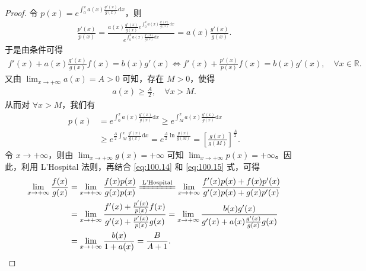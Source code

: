 \documentclass[../../main.tex]{subfiles}%
\begin{document}
\begin{proof}

令 \(p(x) = e^{\int_0^x a(x) \frac{g'(x)}{g(x)} \mathrm{d}x}\)，则
\begin{align}
\frac{p'(x)}{p(x)} = \frac{a(x) \frac{g'(x)}{g(x)} e^{\int_0^x a(x) \frac{g'(x)}{g(x)} \mathrm{d}x}}{e^{\int_0^x a(x) \frac{g'(x)}{g(x)} \mathrm{d}x}} = a(x) \frac{g'(x)}{g(x)}. \label{eq:100.14}
\end{align}
于是由条件可得
\begin{align}
f'(x) + a(x) \frac{g'(x)}{g(x)} f(x) = b(x) g'(x) \Longleftrightarrow f'(x) + \frac{p'(x)}{p(x)} f(x) = b(x) g'(x), \quad \forall x \in \mathbb{R}. \label{eq:100.15}
\end{align}
又由 \(\lim_{x \to +\infty} a(x) = A > 0\) 可知，存在 \(M > 0\)，使得
\begin{align*}
a(x) \geqslant \frac{A}{2}, \quad \forall x > M.
\end{align*}
从而对 \(\forall x > M\)，我们有
\begin{align*}
p(x) &= e^{\int_0^x a(x) \frac{g'(x)}{g(x)} \mathrm{d}x} \geqslant e^{\int_M^x a(x) \frac{g'(x)}{g(x)} \mathrm{d}x} \\
&\geqslant e^{\frac{A}{2} \int_M^x \frac{g'(x)}{g(x)} \mathrm{d}x} = e^{\frac{A}{2} \ln \frac{g(x)}{g(M)}} = \left[ \frac{g(x)}{g(M)} \right]^{\frac{A}{2}}.
\end{align*}
令 \(x \to +\infty\)，则由 \(\lim_{x \to +\infty} g(x) = +\infty\) 可知 \(\lim_{x \to +\infty} p(x) = +\infty\)。因此，利用 L'Hospital 法则，再结合 \eqref{eq:100.14} 和 \eqref{eq:100.15} 式，可得
\begin{align*}
\lim_{x \to +\infty} \frac{f(x)}{g(x)} &= \lim_{x \to +\infty} \frac{f(x) p(x)}{g(x) p(x)} \xlongequal{\text{L'Hospital}} \lim_{x \to +\infty} \frac{f'(x) p(x) + f(x) p'(x)}{g'(x) p(x) + g(x) p'(x)} \\
&= \lim_{x \to +\infty} \frac{f'(x) + \frac{p'(x)}{p(x)} f(x)}{g'(x) + \frac{p'(x)}{p(x)} g(x)} = \lim_{x \to +\infty} \frac{b(x) g'(x)}{g'(x) + a(x) \frac{g'(x)}{g(x)} g(x)} \\
&= \lim_{x \to +\infty} \frac{b(x)}{1 + a(x)} = \frac{B}{A + 1}.
\end{align*}

\end{proof}
\end{document}
